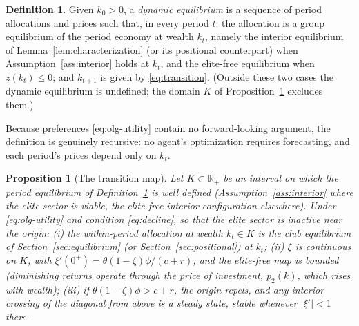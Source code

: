 \documentclass[12pt,letterpaper]{article}
\newtheorem{proposition}{Proposition}
\theoremstyle{definition}
\newtheorem{definition}{Definition}
\newcommand{\R}{\mathbb{R}}
\begin{document}
\begin{definition}\label{def:dynamiceq}
Given $k_0>0$, a \emph{dynamic equilibrium} is a sequence of period allocations and prices such that, in every period $t$: the allocation is a group equilibrium of the period economy at wealth $k_t$, namely the interior equilibrium of Lemma~\ref{lem:characterization} (or its positional counterpart) when Assumption~\ref{ass:interior} holds at $k_t$, and the elite-free equilibrium when $z(k_t)\leq 0$; and $k_{t+1}$ is given by \eqref{eq:transition}.
(Outside these two cases the dynamic equilibrium is undefined; the domain $K$ of Proposition~\ref{prop:map} excludes them.)
\end{definition}

Because preferences \eqref{eq:olg-utility} contain no forward-looking argument, the definition is genuinely recursive: no agent's optimization requires forecasting, and each period's prices depend only on $k_t$.

\begin{proposition}[The transition map]\label{prop:map} Let $K\subset\R_+$ be an interval on which the period equilibrium of Definition~\ref{def:dynamiceq} is well defined (Assumption~\ref{ass:interior} where the elite sector is viable, the elite-free interior configuration elsewhere).
Under \eqref{eq:olg-utility} and condition \eqref{eq:decline}, so that the elite sector is inactive near the origin: (i) the within-period allocation at wealth $k_t\in K$ is the club equilibrium of Section~\ref{sec:equilibrium} (or Section~\ref{sec:positional}) at $k_t$; (ii) $\xi$ is continuous on $K$, with $\xi'(0^+)=\theta(1-\zeta)\phi/(c+r)$, and the elite-free map is bounded (diminishing returns operate through the price of investment, $p_2(k)$, which rises with wealth); (iii) if $\theta(1-\zeta)\phi>c+r$, the origin repels, and any interior crossing of the diagonal from above is a steady state, stable whenever $|\xi'|<1$ there.
\end{proposition}
\end{document}

